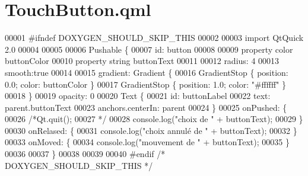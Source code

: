 \hypertarget{TouchButton_8qml}{\section{Touch\-Button.\-qml}
\label{TouchButton_8qml}
}

\begin{DoxyCode}
00001 \textcolor{preprocessor}{#ifndef DOXYGEN\_SHOULD\_SKIP\_THIS}
00002 \textcolor{preprocessor}{}
00003 \textcolor{keyword}{import} QtQuick 2.0
00004 
00005 
00006 Pushable \{
00007     \textcolor{keywordtype}{id}: button
00008 
00009     \textcolor{keyword}{property} color buttonColor
00010     \textcolor{keyword}{property} \textcolor{keywordtype}{string} buttonText
00011 
00012     radius: 4
00013     smooth:\textcolor{keyword}{true}
00014 
00015     gradient: Gradient \{
00016         GradientStop \{ position: 0.0; color: buttonColor \}
00017         GradientStop \{ position: 1.0; color: \textcolor{stringliteral}{"#ffffff"} \}
00018     \}
00019     opacity: 0
00020     Text \{
00021         \textcolor{keywordtype}{id}: buttonLabel
00022         text: parent.buttonText
00023         anchors.centerIn: parent
00024     \}
00025     onPushed: \{
00026         \textcolor{comment}{/*Qt.quit();}
00027 \textcolor{comment}{*/}
00028         console.log(\textcolor{stringliteral}{"choix de "} + buttonText);
00029     \}
00030     onRelased: \{
00031         console.log(\textcolor{stringliteral}{"choix annulé de "} + buttonText);
00032     \}
00033     onMoved: \{
00034         console.log(\textcolor{stringliteral}{"mouvement de "} + buttonText);
00035     \}
00036 
00037 \}
00038 
00039 
00040 \textcolor{preprocessor}{#endif }\textcolor{comment}{/* DOXYGEN\_SHOULD\_SKIP\_THIS */}\textcolor{preprocessor}{}
\end{DoxyCode}
